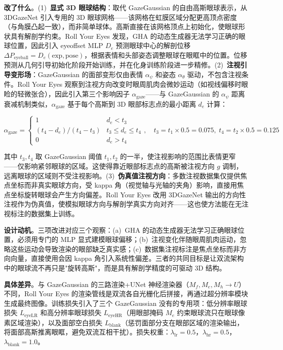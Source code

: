 \textbf{改了什么}。(1)~\textbf{显式 3D 眼球结构}：取代 GazeGaussian 的自由高斯眼球表示，从 3DGazeNet 引入专用的 3D 眼球网格——该网格在虹膜区域分配更高顶点密度（与角膜凸起一致），而非简单球体。高斯直接在该网格顶点上初始化，使眼球形状具有解剖学约束。Roll Your Eyes 发现，GHA 的动态生成器无法学习正确的眼球位置，因此引入 eyeoffset MLP $D_e$ 预测眼球中心的解剖位移 $\Delta P_{\text{eyeball}} = D_e(\text{exp}, \text{pose})$，根据表情和头部姿态调整眼球在眼眶中的位置。位移预测从几何引导初始化阶段开始训练，并在化身训练阶段进一步精修。(2)~\textbf{注视引导变形场}：GazeGaussian 的面部变形仅由表情 $\alpha_\psi$ 和姿态 $\alpha_\theta$ 驱动，不包含注视条件。Roll Your Eyes 观察到注视方向改变时眼周肌肉会微妙运动（如视线偏移时眼睑的轻微张合），因此引入第三个影响因子 $\alpha_{\text{gaze}}$——与 GazeGaussian 的 $\alpha_\psi$ 距离衰减机制类似，$\alpha_{\text{gaze}}$ 基于每个高斯到 3D 眼部标志点的最小距离 $d_e$ 计算：

\[
\alpha_{\text{gaze}} = \begin{cases} 1 & d_e < t_3 \\ (t_4 - d_e)/(t_4 - t_3) & t_3 \leq d_e \leq t_4 \\ 0 & d_e > t_4 \end{cases}, \quad t_3 = t_1 \times 0.5 = 0.075,\; t_4 = t_2 \times 0.5 = 0.125
\]

其中 $t_3, t_4$ 取 GazeGaussian 阈值 $t_1, t_2$ 的一半，使注视影响的范围比表情更窄——仅影响紧邻眼球的区域。这使得靠近眼部标志点的高斯被注视方向 $g$ 调制，远离眼球的区域则不受注视影响。(3)~\textbf{伪真值注视方向}：多数注视数据集仅提供焦点坐标而非真实眼球方向，受 kappa 角（视觉轴与光轴的夹角）影响，直接用焦点坐标旋转眼球会产生方向偏差。Roll Your Eyes 改用 3DGazeNet 输出的方向性注视作为伪真值，使模拟眼球方向与解剖学真实方向对齐——这也使方法能在无注视标注的数据集上训练。

\textbf{设计动机}。三项改进对应三个观察：(a)~GHA 的动态生成器无法学习正确眼球位置，必须用专门的 MLP 显式建模眼球偏移；(b)~注视变化伴随眼周肌肉运动，忽略这些运动会导致渲染的眼部缺乏真实感；(c)~数据集注视标注是焦点坐标而非方向向量，直接使用会因 kappa 角引入系统性偏差。三者的共同目标是让双流架构中的眼球流不再只是"旋转高斯"，而是具有解剖学精度的可驱动 3D 结构。

\textbf{具体差异}。与 GazeGaussian 的三路渲染+UNet 神经渲染器（$M_f, M_e, M_h \to U$）不同，Roll Your Eyes 的渲染管线是双流各自光栅化后拼接，再通过超分辨率模块生成最终图像。训练损失引入了三个 GazeGaussian 没有的专用项：低分辨率眼球损失 $L_{\text{eyeLR}}$ 和高分辨率眼球损失 $L_{\text{eyeHR}}$（用眼部掩码 $M_e$ 约束眼球流只在眼球像素区域渲染），以及面部空白损失 $L_{\text{blank}}$（惩罚面部分支在眼部区域的渲染输出，将面部高斯推离眼眶，避免双流互相干扰）。损失权重：$\lambda_{\text{lr}} = 0.5$，$\lambda_{\text{hr}} = 0.5$，$\lambda_{\text{blank}} = 1.0$。

